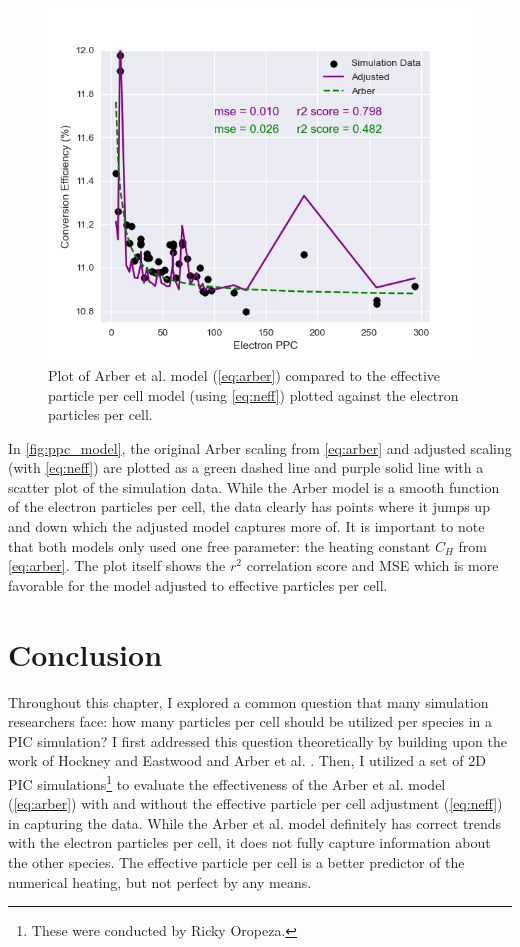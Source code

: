 \begin{figure}
	\includegraphics[width=0.9\linewidth]{planning/images/arber/L-E_1param_eppc.png}
	\caption{Plot of Arber et al. model (\autoref{eq:arber}) compared to the effective particle per cell model (using \autoref{eq:neff}) plotted against the electron particles per cell.} \label{fig:ppc_model}
\end{figure}
 In \autoref{fig:ppc_model}, the original Arber scaling from \autoref{eq:arber} and adjusted scaling (with \autoref{eq:neff}) are plotted as a green dashed line and purple solid line with a scatter plot of the simulation data. While the Arber model is a smooth function of the electron particles per cell, the data clearly has points where it jumps up and down which the adjusted model captures more of. It is important to note that both models only used one free parameter: the heating constant $C_H$ from \autoref{eq:arber}. The plot itself shows the $r^2$ correlation score and \gls{MSE} which is more favorable for the model adjusted to effective particles per cell. 

\section{Conclusion}
Throughout this chapter, I explored a common question that many simulation researchers face: how many particles per cell should be utilized per species in a \gls{PIC} simulation? I first addressed this question theoretically by building upon the work of Hockney and Eastwood \cite{Hockney_1988_PIC} and Arber et al. \cite{Arber_2015_PPCF}. Then, I utilized a set of 2D \gls{PIC} simulations\footnote{These were conducted by Ricky Oropeza.} to evaluate the effectiveness of the Arber et al. model (\autoref{eq:arber}) with and without the effective particle per cell adjustment (\autoref{eq:neff}) in capturing the data. While the Arber et al. model definitely has correct trends with the electron particles per cell, it does not fully capture information about the other species. The effective particle per cell is a better predictor of the numerical heating, but not perfect by any means. 

